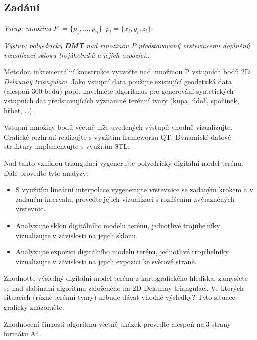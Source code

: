 \documentclass{article}
\begin{document}
\begin{spacing}{1.5}
\section*{Zadání}

\noindent \emph {Vstup: množina P} $= \{p_1, \dots, p_n\}$, $p_i = \{x_i, y_i, z_i\}$.

\noindent \emph {Výstup: polyedrický \textbf{DMT} nad množinou $P$ představovaný vrstevnicemi doplněný vizualizací sklonu trojúhelníků a jejich expozicí.}.

\noindent Metodou inkrementální konstrukce vytvořte nad množinou P vstupních bodů 2D \emph{Delaunay triangulaci}. Jako vstupní data použijte existující geodetická data (alespoň 300 bodů) popř. navrhněte algoritmus pro generování syntetických vstupních dat představujících významné terénní tvary (kupa, údolí, spočinek, hřbet, \dots).

\noindent Vstupní množiny bodů včetně níže uvedených výstupů vhodně vizualizujte. Grafické rozhraní realizujte s využitím frameworku QT. Dynamické datové struktury implementujte s využitím STL.

\noindent Nad takto vzniklou triangulací vygenerujte polyedrický digitální model terénu. Dále proveďte tyto analýzy:

\begin{itemize}
  \item S využitím lineární interpolace vygenerujte vrstevnice se zadaným krokem a v zadaném intervalu, proveďte jejich vizualizaci s rozlišením zvýrazněných vrstevnic.
  \item Analyzujte sklon digitálního modelu terénu, jednotlivé trojúhelníky vizualizujte v závislosti na jejich sklonu.
  \item Analyzujte expozici digitálního modelu terénu, jednotlivé trojúhelníky vizualizujte v závislosti na jejich expozici ke světové straně.
\end{itemize}

\noindent Zhodnoťte výsledný digitální model terénu z kartografického hlediska, zamyslete se nad slabinami algoritmu založeného na 2D Delaunay triangulaci. Ve kterých situacích (různé terénní tvary) nebude dávat vhodné výsledky? Tyto situace graficky znázorněte.

\noindent Zhodnocení činnosti algoritmu včetně ukázek proveďte alespoň na 3 strany formátu A4.


\end{spacing}
\end{document}
